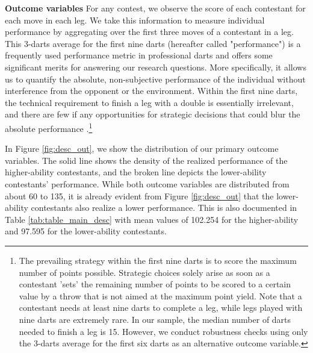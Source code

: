 \documentclass[11pt,a4paper]{article}
\begin{document}
\textbf{Outcome variables} For any contest, we observe the score of each contestant for each move in each leg.  
We take this information to measure individual performance by aggregating over the first three moves of a contestant in a leg. This 3-darts average for the first nine darts (hereafter called "performance") is a frequently used performance metric in professional darts and offers some significant merits for answering our research questions. More specifically, it allows us to quantify the absolute, non-subjective performance of the individual without interference from the opponent or the environment. Within the first nine darts, the technical requirement to finish a leg with a double is essentially irrelevant, and there are few if any opportunities for strategic decisions that could blur the absolute performance \cite{Klein.2020}.\footnote{The prevailing strategy within the first nine darts is to score the maximum number of points possible. Strategic choices solely arise as soon as a contestant 'sets' the remaining number of points to be scored to a certain value by a throw that is not aimed at the maximum point yield. Note that a contestant needs at least nine darts to complete a leg, while legs played with nine darts are extremely rare. In our sample, the median number of darts needed to finish a leg is 15. However, we conduct robustness checks using only the 3-darts average for the first six darts as an alternative outcome variable.}\par

In Figure \ref{fig:desc_out}, we show the distribution of our primary outcome variables. The solid line shows the density of the realized performance of the higher-ability contestants, and the broken line depicts the lower-ability contestants' performance. While both outcome variables are distributed from about 60 to 135, it is already evident from Figure \ref{fig:desc_out} that the lower-ability contestants also realize a lower performance. This is also documented in Table \ref{tab:table_main_desc} with mean values of 102.254 for the higher-ability and 97.595 for the lower-ability contestants. \par 
\end{document}
